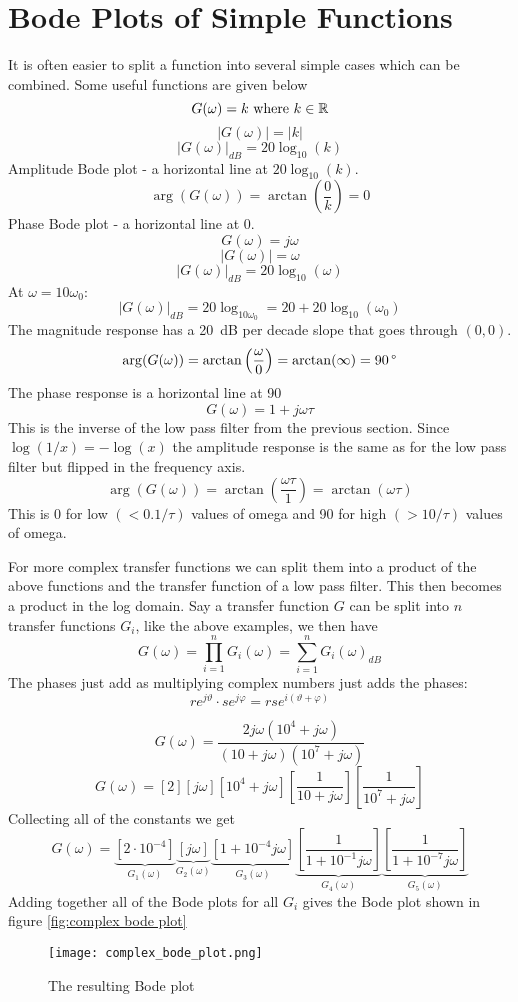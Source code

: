 \documentclass{article}
\begin{document}
    \section{Bode Plots of Simple Functions}
    It is often easier to split a function into several simple cases which can be combined. Some useful functions are given below
    \[G(\omega) = k\text{ where }k\in\mathbb{R}\]
    \[|G(\omega)| = |k|\]
    \[|G(\omega)|_{\si{dB}} = 20\log_{10}(k)\]
    Amplitude Bode plot - a horizontal line at \(20\log_{10}(k)\).
    \[\arg(G(\omega)) = \arctan\left(\frac{0}{k}\right) = 0\]
    Phase Bode plot - a horizontal line at 0.
    \[G(\omega) = j\omega\]
    \[|G(\omega)| = \omega\]
    \[|G(\omega)|_{\si{dB}} = 20\log_{10}(\omega)\]
    At \(\omega = 10\omega_0\):
    \[|G(\omega)|_{\si{dB}} = 20\log_{10\omega_0} = 20 + 20\log_{10}(\omega_0)\]
    The magnitude response has a \SI{20}{dB} per decade slope that goes through \((0, 0)\).
    \[\arg(G(\omega)) = \arctan\left(\frac{\omega}{0}\right) = \arctan(\infty) = \SI{90}{\SIUnitSymbolDegree}\]
    The phase response is a horizontal line at \SI{90}{\SIUnitSymbolDegree}
    \[G(\omega) = 1 + j\omega\tau\]
    This is the inverse of the low pass filter from the previous section.
    Since \(\log(1/x) = -\log(x)\) the amplitude response is the same as for the low pass filter but flipped in the frequency axis.
    \[\arg(G(\omega)) = \arctan\left(\frac{\omega\tau}{1}\right) = \arctan(\omega\tau)\]
    This is 0 for low \((<0.1/\tau)\) values of omega and \SI{90}{\SIUnitSymbolDegree} for high \((>10/\tau)\) values of omega.
    
    For more complex transfer functions we can split them into a product of the above functions and the transfer function of a low pass filter.
    This then becomes a product in the log domain.
    Say a transfer function \(G\) can be split into \(n\) transfer functions \(G_i\), like the above examples, we then have
    \[G(\omega) = \prod_{i=1}^{n}G_i(\omega) = \sum_{i=1}^{n}G_i(\omega)_{\si{dB}}\]
    The phases just add as multiplying complex numbers just adds the phases:
    \[re^{j\vartheta} \cdot se^{j\varphi} = rse^{i(\vartheta + \varphi)}\]
    
    \example
    \[G(\omega) = \frac{2j\omega(10^4 + j\omega)}{(10 + j\omega)(10^7 + j\omega)}\]
    \[G(\omega) = [2][j\omega][10^4+j\omega]\left[\frac{1}{10 + j\omega}\right]\left[\frac{1}{10^7 + j\omega}\right]\]
    Collecting all of the constants we get
    \[G(\omega) = \underbrace{[2\cdot 10^{-4}]}_{G_1(\omega)} \underbrace{[j\omega]}_{G_2(\omega)} \underbrace{[1 + 10^{-4}j\omega]}_{G_3(\omega)} \underbrace{\left[\frac{1}{1 + 10^{-1}j\omega}\right]}_{G_4(\omega)} \underbrace{\left[\frac{1}{1 + 10^{-7}j\omega}\right]}_{G_5(\omega)}\]
    Adding together all of the Bode plots for all \(G_i\) gives the Bode plot shown in figure \ref{fig:complex bode plot}
    \begin{figure}[ht]
        \centering
        \texttt{[image: complex\_bode\_plot.png]}
        \caption{The resulting Bode plot}
    \end{figure}
\end{document}
